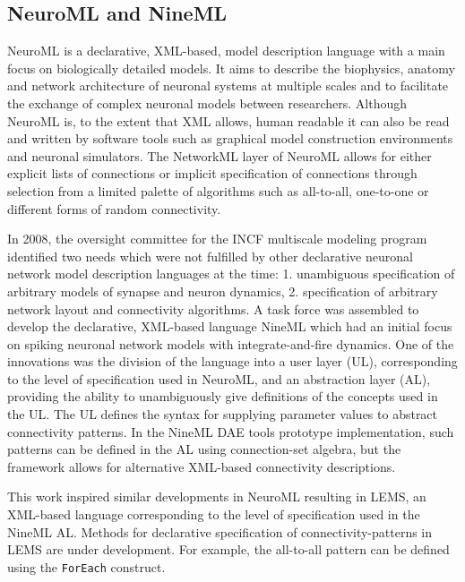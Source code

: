 \documentclass{frontiersSCNS} %
\begin{document}
\subsection{NeuroML and NineML}
NeuroML \citep{gleeson10,goddard01} is a declarative, XML-based, model
description language with a main focus on biologically detailed
models. It aims to describe the biophysics, anatomy and network
architecture of neuronal systems at multiple scales and to facilitate
the exchange of complex neuronal models between researchers. Although
NeuroML is, to the extent that XML allows, human readable it can also
be read and written by software tools such as
graphical model construction environments \citep{gleeson07} and
neuronal simulators. The NetworkML layer of NeuroML allows for either
explicit lists of connections or implicit specification of connections
through selection from a limited palette of algorithms such as
all-to-all, one-to-one or different forms of random connectivity.

In 2008, the oversight committee for the INCF multiscale modeling
program identified two needs which were not fulfilled by other
declarative neuronal network model description languages at the time:
1. unambiguous specification of arbitrary models of synapse and neuron
dynamics, 2. specification of arbitrary network layout and
connectivity algorithms.  A task force was assembled to develop the
declarative, XML-based language NineML \citep{raikov11} which had an
initial focus on spiking neuronal network models with
integrate-and-fire dynamics.  One of the innovations was the division
of the language into a user layer (UL), corresponding to the level of
specification used in NeuroML, and an abstraction layer (AL),
providing the ability to unambiguously give definitions of the
concepts used in the UL. The UL defines the syntax for supplying
parameter values to abstract connectivity patterns. In the NineML DAE
tools prototype implementation, such patterns can be defined in the AL
using connection-set algebra, but the framework allows for alternative
XML-based connectivity descriptions.

This work inspired similar developments in NeuroML resulting in LEMS,
an XML-based language corresponding to the level of specification used
in the NineML AL.  Methods for declarative specification of
connectivity-patterns in LEMS are under development.  For example, the
all-to-all pattern can be defined using the \verb|ForEach| construct.
\end{document}
